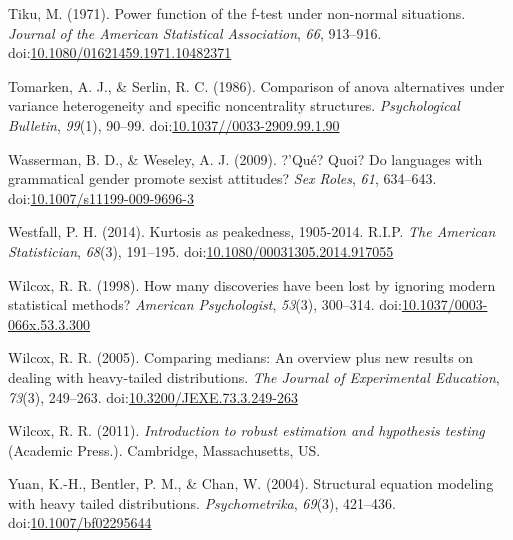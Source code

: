 \documentclass[man,floatsintext]{apa6}
\begin{document}
\leavevmode\hypertarget{ref-Tiku_1971}{}%
Tiku, M. (1971). Power function of the f-test under non-normal situations. \emph{Journal of the American Statistical Association}, \emph{66}, 913--916. doi:\href{https://doi.org/10.1080/01621459.1971.10482371}{10.1080/01621459.1971.10482371}

\leavevmode\hypertarget{ref-Tomarken_and_Serlin_1986}{}%
Tomarken, A. J., \& Serlin, R. C. (1986). Comparison of anova alternatives under variance heterogeneity and specific noncentrality structures. \emph{Psychological Bulletin}, \emph{99}(1), 90--99. doi:\href{https://doi.org/10.1037//0033-2909.99.1.90}{10.1037//0033-2909.99.1.90}

\leavevmode\hypertarget{ref-Wasserman_and_Weseley_2009}{}%
Wasserman, B. D., \& Weseley, A. J. (2009). ?'Qué? Quoi? Do languages with grammatical gender promote sexist attitudes? \emph{Sex Roles}, \emph{61}, 634--643. doi:\href{https://doi.org/10.1007/s11199-009-9696-3}{10.1007/s11199-009-9696-3}

\leavevmode\hypertarget{ref-Westfall_2014}{}%
Westfall, P. H. (2014). Kurtosis as peakedness, 1905-2014. R.I.P. \emph{The American Statistician}, \emph{68}(3), 191--195. doi:\href{https://doi.org/10.1080/00031305.2014.917055}{10.1080/00031305.2014.917055}

\leavevmode\hypertarget{ref-Wilcox_1998}{}%
Wilcox, R. R. (1998). How many discoveries have been lost by ignoring modern statistical methods? \emph{American Psychologist}, \emph{53}(3), 300--314. doi:\href{https://doi.org/10.1037/0003-066x.53.3.300}{10.1037/0003-066x.53.3.300}

\leavevmode\hypertarget{ref-Wilcox_2005}{}%
Wilcox, R. R. (2005). Comparing medians: An overview plus new results on dealing with heavy-tailed distributions. \emph{The Journal of Experimental Education}, \emph{73}(3), 249--263. doi:\href{https://doi.org/10.3200/JEXE.73.3.249-263}{10.3200/JEXE.73.3.249-263}

\leavevmode\hypertarget{ref-Wilcox_2011}{}%
Wilcox, R. R. (2011). \emph{Introduction to robust estimation and hypothesis testing} (Academic Press.). Cambridge, Massachusetts, US.

\leavevmode\hypertarget{ref-Yuan_et_al_2004}{}%
Yuan, K.-H., Bentler, P. M., \& Chan, W. (2004). Structural equation modeling with heavy tailed distributions. \emph{Psychometrika}, \emph{69}(3), 421--436. doi:\href{https://doi.org/10.1007/bf02295644}{10.1007/bf02295644}

\clearpage
\makeatletter
\efloat@restorefloats
\makeatother
\end{document}
